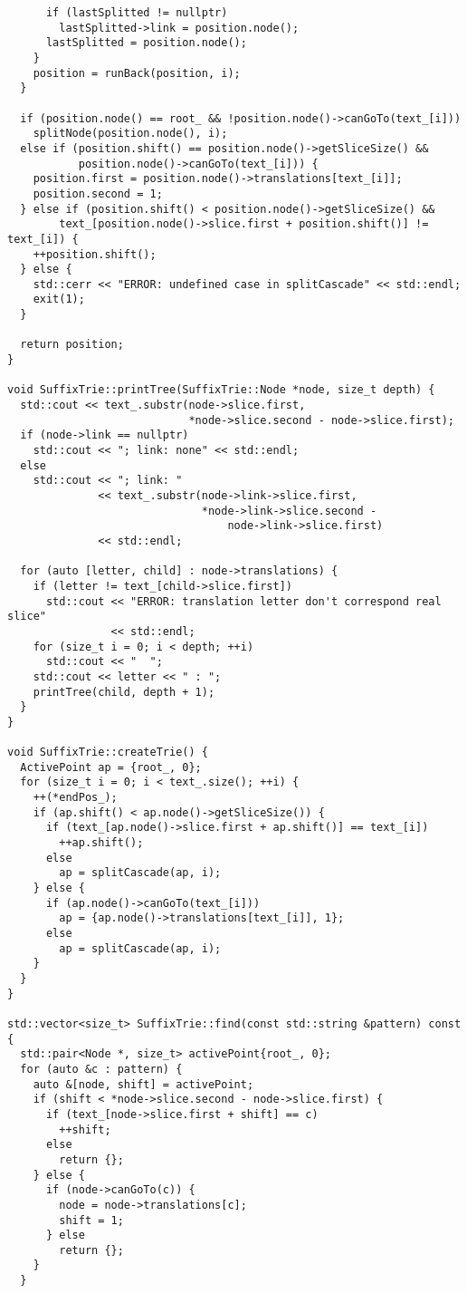 \begin{verbatim}
      if (lastSplitted != nullptr)
        lastSplitted->link = position.node();
      lastSplitted = position.node();
    }
    position = runBack(position, i);
  }

  if (position.node() == root_ && !position.node()->canGoTo(text_[i]))
    splitNode(position.node(), i);
  else if (position.shift() == position.node()->getSliceSize() &&
           position.node()->canGoTo(text_[i])) {
    position.first = position.node()->translations[text_[i]];
    position.second = 1;
  } else if (position.shift() < position.node()->getSliceSize() &&
        text_[position.node()->slice.first + position.shift()] != text_[i]) {
    ++position.shift();
  } else {
    std::cerr << "ERROR: undefined case in splitCascade" << std::endl;
    exit(1);
  }

  return position;
}

void SuffixTrie::printTree(SuffixTrie::Node *node, size_t depth) {
  std::cout << text_.substr(node->slice.first,
                            *node->slice.second - node->slice.first);
  if (node->link == nullptr)
    std::cout << "; link: none" << std::endl;
  else
    std::cout << "; link: "
              << text_.substr(node->link->slice.first,
                              *node->link->slice.second -
                                  node->link->slice.first)
              << std::endl;

  for (auto [letter, child] : node->translations) {
    if (letter != text_[child->slice.first])
      std::cout << "ERROR: translation letter don't correspond real slice"
                << std::endl;
    for (size_t i = 0; i < depth; ++i)
      std::cout << "  ";
    std::cout << letter << " : ";
    printTree(child, depth + 1);
  }
}

void SuffixTrie::createTrie() {
  ActivePoint ap = {root_, 0};
  for (size_t i = 0; i < text_.size(); ++i) {
    ++(*endPos_);
    if (ap.shift() < ap.node()->getSliceSize()) {
      if (text_[ap.node()->slice.first + ap.shift()] == text_[i])
        ++ap.shift();
      else
        ap = splitCascade(ap, i);
    } else {
      if (ap.node()->canGoTo(text_[i]))
        ap = {ap.node()->translations[text_[i]], 1};
      else
        ap = splitCascade(ap, i);
    }
  }
}

std::vector<size_t> SuffixTrie::find(const std::string &pattern) const {
  std::pair<Node *, size_t> activePoint{root_, 0};
  for (auto &c : pattern) {
    auto &[node, shift] = activePoint;
    if (shift < *node->slice.second - node->slice.first) {
      if (text_[node->slice.first + shift] == c)
        ++shift;
      else
        return {};
    } else {
      if (node->canGoTo(c)) {
        node = node->translations[c];
        shift = 1;
      } else
        return {};
    }
  }


\end{verbatim}
